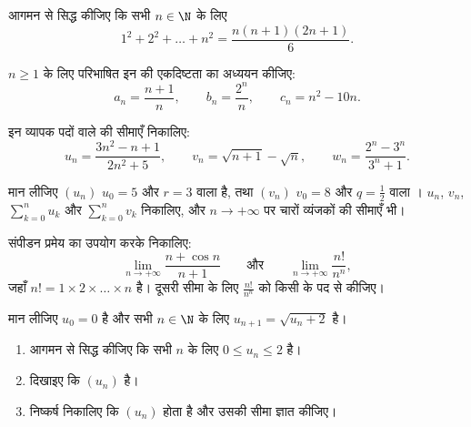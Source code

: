 \begin{exercise}[$\star$]\label{exo:g12:seq:1}
आगमन से सिद्ध कीजिए कि सभी $n \in \N$ के लिए
\[
1^2 + 2^2 + \dots + n^2 = \frac{n(n+1)(2n+1)}{6}.
\]
\end{exercise}

\begin{exercise}[$\star$]\label{exo:g12:seq:2}
$n \geq 1$ के लिए परिभाषित इन  की एकदिष्टता का अध्ययन कीजिए:
\[
a_n = \frac{n+1}{n}, \qquad
b_n = \frac{2^n}{n}, \qquad
c_n = n^2 - 10n .
\]
\end{exercise}

\begin{exercise}[$\star$]\label{exo:g12:seq:3}
इन व्यापक पदों वाले  की सीमाएँ निकालिए:
\[
u_n = \frac{3n^2 - n + 1}{2n^2 + 5}, \qquad
v_n = \sqrt{n+1} - \sqrt{n}, \qquad
w_n = \frac{2^n - 3^n}{3^n + 1}.
\]
\end{exercise}

\begin{exercise}[$\star$]\label{exo:g12:seq:4}
मान लीजिए $(u_n)$ $u_0 = 5$ और  $r = 3$ वाला  है, तथा $(v_n)$
$v_0 = 8$ और  $q = \frac{1}{2}$ वाला । $u_n$, $v_n$, $\sum_{k=0}^{n} u_k$ और
$\sum_{k=0}^{n} v_k$ निकालिए, और $n \to +\infty$ पर चारों व्यंजकों की सीमाएँ भी।
\end{exercise}

\begin{exercise}[$\star\star$]\label{exo:g12:seq:5}
संपीडन प्रमेय का उपयोग करके निकालिए:
\[
\lim_{n\to+\infty} \frac{n + \cos n}{n + 1}
\qquad\text{और}\qquad
\lim_{n\to+\infty} \frac{n!}{n^n},
\]
जहाँ $n! = 1 \times 2 \times \dots \times n$ है। दूसरी सीमा के लिए $\frac{n!}{n^n}$ को किसी  के पद से
 कीजिए।
\end{exercise}

\begin{exercise}[$\star\star$]\label{exo:g12:seq:6}
मान लीजिए $u_0 = 0$ है और सभी $n \in \N$ के लिए $u_{n+1} = \sqrt{u_n + 2}$ है।
\begin{enumerate}
  \item आगमन से सिद्ध कीजिए कि सभी $n$ के लिए $0 \leq u_n \leq 2$ है।
  \item दिखाइए कि $(u_n)$  है।
  \item निष्कर्ष निकालिए कि $(u_n)$  होता है और उसकी सीमा ज्ञात कीजिए।
\end{enumerate}
\end{exercise}

